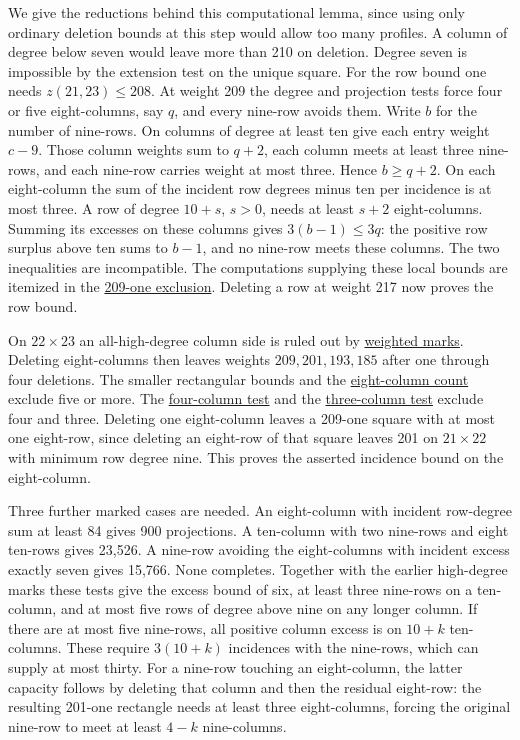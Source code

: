\documentclass[11pt]{article}
\newcommand{\proofdir}[2]{\href{https://github.com/jasondavies/zarankiewicz-numbers/blob/b33dcd207d62331adc02e1cb6ef0021094ebd40b/#1}{#2}}
\begin{document}
We give the reductions behind this computational lemma, since using
only ordinary deletion bounds at this step would allow too many profiles.
A column of degree below seven would leave more than 210 on deletion.
Degree seven is impossible by the extension test on the unique square.
For the row bound one needs $z(21,23)\le208$. At weight 209 the
degree and projection tests force four or five eight-columns, say $q$,
and every nine-row avoids them. Write $b$ for the number of nine-rows.
On columns of degree at least ten give each entry weight $c-9$.
Those column weights sum to $q+2$, each column meets at least three
nine-rows, and each nine-row carries weight at most three. Hence
$b\ge q+2$. On each eight-column the sum of the incident row degrees
minus ten per incidence is at most three. A row of degree $10+s$,
$s>0$, needs at least $s+2$ eight-columns. Summing its excesses on
these columns gives $3(b-1)\le3q$: the positive row surplus above ten
sums to $b-1$, and no nine-row meets these columns. The two inequalities
are incompatible. The computations supplying these local bounds are
itemized in the \proofdir{z21x23-k33/no-209.md}{209-one exclusion}.
Deleting a row at weight 217 now proves the row bound.

On $22\times23$ an all-high-degree column side is ruled out by
\proofdir{z22x23-k33/min9.md}{weighted marks}. Deleting eight-columns
then leaves weights $209,201,193,185$ after one through four deletions.
The smaller rectangular bounds and the
\proofdir{z22x23-k33/eight-column-count.md}{eight-column count} exclude
five or more. The \proofdir{z22x23-k33/four-column-cover.md}{four-column
test} and the \proofdir{z22x23-k33/three-profile-proof.md}{three-column
test} exclude four and three. Deleting one eight-column leaves a
209-one square with at most one eight-row, since deleting an eight-row
of that square leaves 201 on $21\times22$ with minimum row degree nine.
This proves the asserted incidence bound on the eight-column.

Three further marked cases are needed. An eight-column with incident
row-degree sum at least 84 gives 900 projections. A ten-column with
two nine-rows and eight ten-rows gives 23,526. A nine-row avoiding
the eight-columns with incident excess exactly seven gives 15,766.
None completes. Together with the earlier high-degree marks these
tests give the excess bound of six, at least three nine-rows on a
ten-column, and at most five rows of degree above nine on any longer
column. If there are at most five nine-rows, all positive column excess
is on $10+k$ ten-columns. These require $3(10+k)$ incidences with the
nine-rows, which can supply at most thirty. For a nine-row touching
an eight-column, the latter capacity follows by deleting that column
and then the residual eight-row: the resulting 201-one rectangle
needs at least three eight-columns, forcing the original nine-row to
meet at least $4-k$ nine-columns.
\end{document}
